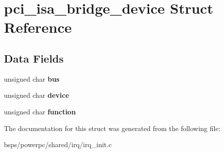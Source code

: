 \hypertarget{structpci__isa__bridge__device}{}\section{pci\+\_\+isa\+\_\+bridge\+\_\+device Struct Reference}
\label{structpci__isa__bridge__device}
\subsection*{Data Fields}
\begin{DoxyCompactItemize}
\item 
\mbox{\label{structpci__isa__bridge__device_a127601375866e010608606b072164eb1}} 
unsigned char {\bfseries bus}
\item 
\mbox{\label{structpci__isa__bridge__device_a38966d78018ce879ca014f89ac1d16b7}} 
unsigned char {\bfseries device}
\item 
\mbox{\label{structpci__isa__bridge__device_a245fb60d46cf2dd768e58816f7a38f85}} 
unsigned char {\bfseries function}
\end{DoxyCompactItemize}


The documentation for this struct was generated from the following file\+:\begin{DoxyCompactItemize}
\item 
bsps/powerpc/shared/irq/irq\+\_\+init.\+c\end{DoxyCompactItemize}

